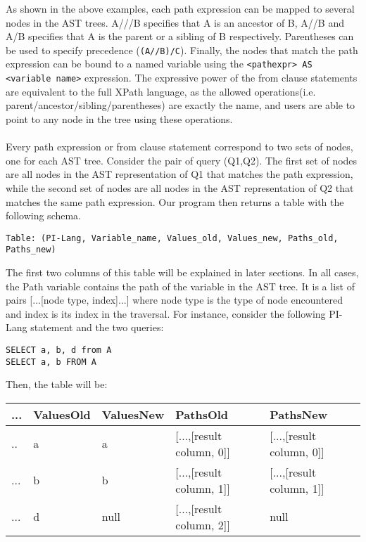 \noindent As shown in the above examples, each path expression can be mapped to several nodes in the AST trees. A///B specifies that A is an ancestor of B, A//B and A/B specifies that A is the parent or a sibling of B respectively. Parentheses can be used to specify precedence (\texttt{(A//B)/C}).  Finally, the nodes that match the path expression can be bound to a named variable using the \texttt{<pathexpr> AS <variable name>} expression. The expressive power of the from clause statements are equivalent to the full XPath language, as the allowed operations(i.e. parent/ancestor/sibling/parentheses) are exactly the name, and users are able to point to any node in the tree using these operations.\\\\
Every path expression or from clause statement correspond to two sets of nodes, one for each AST tree. Consider the pair of query (Q1,Q2). The first set of nodes are all nodes in the AST representation of Q1 that matches the path expression, while the second set of nodes are all nodes in the AST representation of Q2 that matches the same path expression. Our program then returns a table with the following schema.
\begin{verbatim}
Table: (PI-Lang, Variable_name, Values_old, Values_new, Paths_old, Paths_new)
\end{verbatim}
The first two columns of this table will be explained in later sections. In all cases, the Path variable contains the path of the variable in the AST tree. It is a list of pairs [...[node type, index]...] where node type is the type of node encountered and index is its index in the traversal. For instance, consider the following PI-Lang statement and the two queries:
\begin{verbatim}
SELECT a, b, d from A
SELECT a, b FROM A
\end{verbatim}
Then, the table will be:
\begin{center}
    \begin{tabular}{| l | l | l | l | l |}
    \hline
    ...& ValuesOld & ValuesNew& PathsOld & PathsNew \\ \hline
    .. & a & a& [...,[result column, 0]] &[...,[result column, 0]] \\
    ... & b & b& [...,[result column, 1]] &[...,[result column, 1]] \\
    ... & d & null& [...,[result column, 2]] &null \\
    \hline
    \end{tabular}
\end{center}
